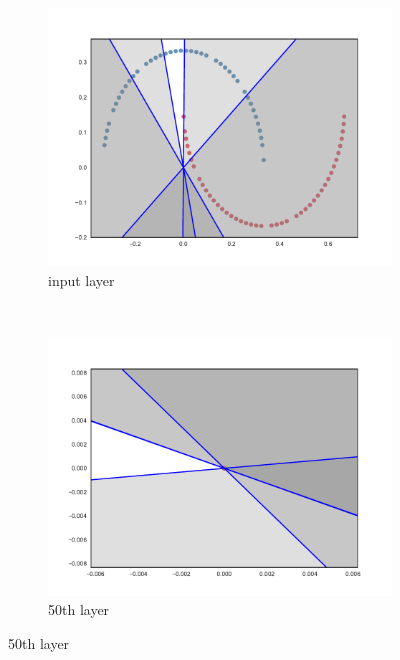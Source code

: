\begin{figure}
  \centering
    \begin{subfigure}[b]{0.3\textwidth}
        \includegraphics[width=\textwidth]{img/init/relu/conv2d_1-0.pdf}
        \caption{\ReLU input layer}
        \label{fig:reluInitInput}
    \end{subfigure}
    ~ %
    \begin{subfigure}[b]{0.3\textwidth}
        \includegraphics[width=\textwidth]{img/init/relu/conv2d_50-0.pdf}
        \caption{\ReLU 50th layer}
        \label{fig:reluInit501}
    \end{subfigure}

\end{figure}
